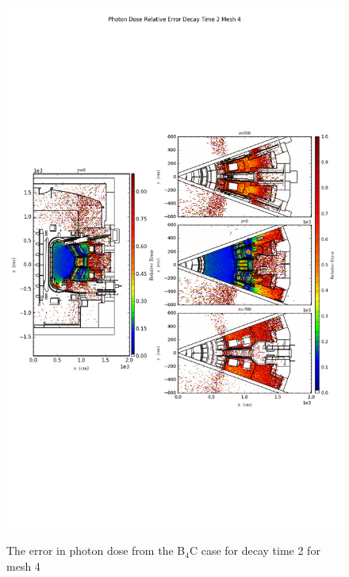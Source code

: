 \begin{figure}[ht!]
\centering
\includegraphics[trim={0cm 9cm 0cm 10cm},clip,scale=0.75]{../plots/final_model_with_b4c/Photon_Dose_Relative_Error_Decay_Time_2_Mesh_4.png}
\label{fig:photons_dc2_no4bc_m4_error}
\caption{The error in photon dose from the B$_4$C case for decay time 2 for mesh 4}
\end{figure}
